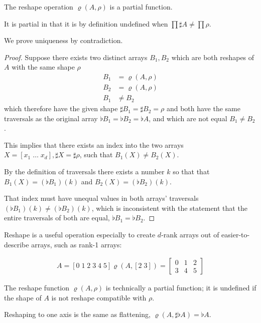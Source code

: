 \documentclass{DIKU-report-variant}
\begin{document}
\begin{theorem}
  \label{the:unique-reshape}
  The reshape operation \(\varrho(A, \rho)\) is a partial function.

  It is partial in that it is by definition undefined when \(\prod \sharp A \ne \prod \rho\).

  We prove uniqueness by contradiction.
\end{theorem}
\begin{proof}
  Suppose there exists two distinct arrays \(B_1, B_2\) which are both reshapes of \(A\) with
  the same shape \(\rho\)
  \begin{align*}
    B_1 &= \varrho(A, \rho) \\
    B_2 &= \varrho(A, \rho) \\
    B_1 &\ne B_2
  \end{align*}
  which therefore  have the given shape \(\sharp B_1 = \sharp B_2 = \rho\)
  and both have the same traversals as the original array \(\flat B_1 = \flat B_2 = \flat A\),
  and which are not equal \(B_1 \neq B_2\).
  
  This implies that there exists an index into the two arrays \(X = [x_1\; \dots\; x_d], \sharp X = \sharp \rho\),
  such that \(B_1(X) \neq B_2(X)\).

  By the definition of traversals there exists a number \(k\)
  so that that \(B_1(X) = (\flat B_1)(k)\) and \(B_2(X) = (\flat B_2)(k)\).
  
  That index must have unequal values in both arrays' traversals \((\flat B_1)(k) \neq (\flat B_2)(k)\),
  which is inconsistent with the statement that the entire traversals of both are equal, \(\flat B_1 = \flat B_2\). \contradict
\end{proof}

\begin{example}
  \label{ex:reshape}
  Reshape is a useful operation especially to create \(d\)-rank arrays
  out of easier-to-describe arrays, such as rank-1 arrays:

  \begin{align*}
    A = [0\; 1\; 2\; 3\; 4\; 5]
    \varrho(A, [2\;3]) = \begin{bmatrix}
      0 & 1 & 2 \\
      3 & 4 & 5 
    \end{bmatrix}
  \end{align*}
\end{example}

\begin{remark}
  \label{def:rho-func}
  The reshape function \(\varrho(A, \rho)\) is technically a partial function; it is
  undefined if the shape of \(A\) is not reshape compatible with \(\rho\).

  Reshaping to one axis is the same as flattening, \(\varrho(A, \sharp \flat A) = \flat A\).
\end{remark}
\end{document}
